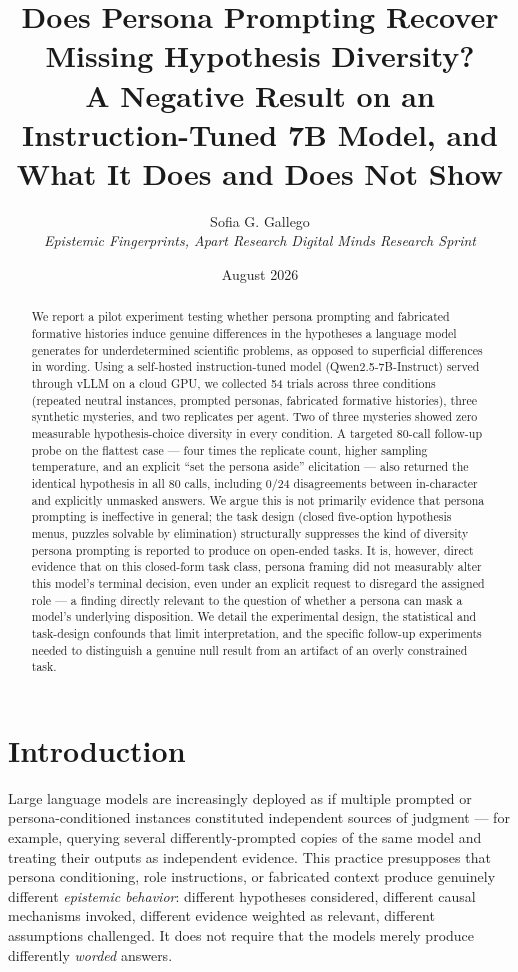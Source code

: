 \documentclass[11pt]{article}
\title{\textbf{Does Persona Prompting Recover Missing Hypothesis Diversity?}\\
\large A Negative Result on an Instruction-Tuned 7B Model, and What It Does and Does Not Show}
\author{Sofia G. Gallego \\ \textit{Epistemic Fingerprints, Apart Research Digital Minds Research Sprint}}
\date{August 2026}
\begin{document}
\maketitle

\begin{abstract}
We report a pilot experiment testing whether persona prompting and fabricated formative
histories induce genuine differences in the hypotheses a language model generates for
underdetermined scientific problems, as opposed to superficial differences in wording. Using
a self-hosted instruction-tuned model (Qwen2.5-7B-Instruct) served through vLLM on a cloud GPU,
we collected 54 trials across three conditions (repeated neutral instances, prompted personas,
fabricated formative histories), three synthetic mysteries, and two replicates per agent. Two
of three mysteries showed zero measurable hypothesis-choice diversity in every condition. A
targeted 80-call follow-up probe on the flattest case --- four times the replicate count, higher
sampling temperature, and an explicit ``set the persona aside'' elicitation --- also returned the
identical hypothesis in all 80 calls, including 0/24 disagreements between in-character and
explicitly unmasked answers. We argue this is not primarily evidence that persona prompting is
ineffective in general; the task design (closed five-option hypothesis menus, puzzles solvable by
elimination) structurally suppresses the kind of diversity persona prompting is reported to produce
on open-ended tasks. It is, however, direct evidence that on this closed-form task class, persona
framing did not measurably alter this model's terminal decision, even under an explicit request to
disregard the assigned role --- a finding directly relevant to the question of whether a persona can
mask a model's underlying disposition. We detail the experimental design, the statistical and
task-design confounds that limit interpretation, and the specific follow-up experiments needed to
distinguish a genuine null result from an artifact of an overly constrained task.
\end{abstract}

\section{Introduction}

Large language models are increasingly deployed as if multiple prompted or persona-conditioned
instances constituted independent sources of judgment --- for example, querying several
differently-prompted copies of the same model and treating their outputs as independent evidence.
This practice presupposes that persona conditioning, role instructions, or fabricated context
produce genuinely different \emph{epistemic behavior}: different hypotheses considered, different
causal mechanisms invoked, different evidence weighted as relevant, different assumptions
challenged. It does not require that the models merely produce differently \emph{worded} answers.
\end{document}
